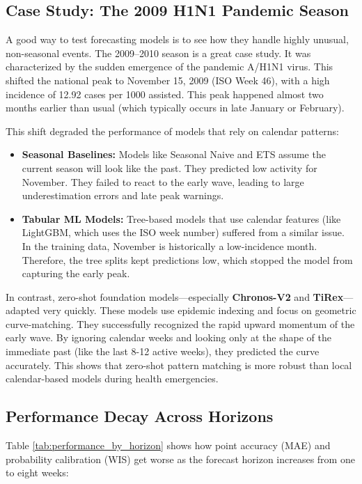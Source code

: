 \subsection{Case Study: The 2009 H1N1 Pandemic Season}

A good way to test forecasting models is to see how they handle highly unusual, non-seasonal events. The 2009--2010 season is a great case study. It was characterized by the sudden emergence of the pandemic A/H1N1 virus. This shifted the national peak to November 15, 2009 (ISO Week 46), with a high incidence of 12.92 cases per 1000 assisted. This peak happened almost two months earlier than usual (which typically occurs in late January or February).

This shift degraded the performance of models that rely on calendar patterns:
\begin{itemize}
    \item \textbf{Seasonal Baselines:} Models like Seasonal Naive and ETS assume the current season will look like the past. They predicted low activity for November. They failed to react to the early wave, leading to large underestimation errors and late peak warnings.
    \item \textbf{Tabular ML Models:} Tree-based models that use calendar features (like LightGBM, which uses the ISO week number) suffered from a similar issue. In the training data, November is historically a low-incidence month. Therefore, the tree splits kept predictions low, which stopped the model from capturing the early peak.
\end{itemize}

In contrast, zero-shot foundation models---especially \textbf{Chronos-V2} and \textbf{TiRex}---adapted very quickly. These models use epidemic indexing and focus on geometric curve-matching. They successfully recognized the rapid upward momentum of the early wave. By ignoring calendar weeks and looking only at the shape of the immediate past (like the last 8-12 active weeks), they predicted the curve accurately. This shows that zero-shot pattern matching is more robust than local calendar-based models during health emergencies.

\subsection{Performance Decay Across Horizons}
Table \ref{tab:performance_by_horizon} shows how point accuracy (MAE) and probability calibration (WIS) get worse as the forecast horizon increases from one to eight weeks:

